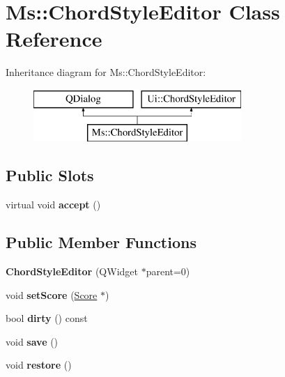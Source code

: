 \hypertarget{class_ms_1_1_chord_style_editor}{}\section{Ms\+:\+:Chord\+Style\+Editor Class Reference}
\label{class_ms_1_1_chord_style_editor}
Inheritance diagram for Ms\+:\+:Chord\+Style\+Editor\+:\begin{figure}[H]
\begin{center}
\leavevmode
\includegraphics[height=2.000000cm]{class_ms_1_1_chord_style_editor}
\end{center}
\end{figure}
\subsection*{Public Slots}
\begin{DoxyCompactItemize}
\item 
\mbox{\label{class_ms_1_1_chord_style_editor_a7c2a7ef1575183068f0f826b11096625}} 
virtual void {\bfseries accept} ()
\end{DoxyCompactItemize}
\subsection*{Public Member Functions}
\begin{DoxyCompactItemize}
\item 
\mbox{\label{class_ms_1_1_chord_style_editor_af5f2cbb6987f4e701ec96913fc970c1e}} 
{\bfseries Chord\+Style\+Editor} (Q\+Widget $\ast$parent=0)
\item 
\mbox{\label{class_ms_1_1_chord_style_editor_a22c3794b271ecfe243e313e5f132cc45}} 
void {\bfseries set\+Score} (\hyperlink{class_ms_1_1_score}{Score} $\ast$)
\item 
\mbox{\label{class_ms_1_1_chord_style_editor_a586e712076ae6cd0c91a21a769066c44}} 
bool {\bfseries dirty} () const
\item 
\mbox{\label{class_ms_1_1_chord_style_editor_ab38688ddabb5d716d88c4e98e0460da9}} 
void {\bfseries save} ()
\item 
\mbox{\label{class_ms_1_1_chord_style_editor_a2226c6ef6601b42f9217e096e7e64ce5}} 
void {\bfseries restore} ()
\end{DoxyCompactItemize}


